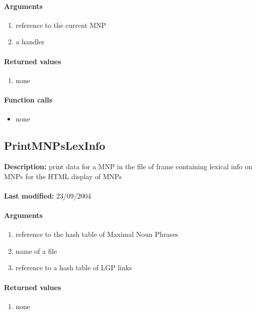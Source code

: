 \paragraph{Arguments}
\begin{enumerate}
\item reference to the current MNP
\item a handler
\end{enumerate}

\paragraph{Returned values}
\begin{enumerate}
\item none
\end{enumerate}

\paragraph{Function calls}
\begin{itemize}
\item none
\end{itemize}

\subsection{PrintMNPsLexInfo}
\textbf{Description:} print data for a MNP in the file of frame containing lexical info on MNPs for the HTML display of MNPs\\
\\\textbf{Last modified:} 23/09/2004

\paragraph{Arguments}
\begin{enumerate}
\item reference to the hash table of Maximal Noun Phrases
\item name of a file
\item reference to a hash table of LGP links
\end{enumerate}

\paragraph{Returned values}
\begin{enumerate}
\item none
\end{enumerate}


